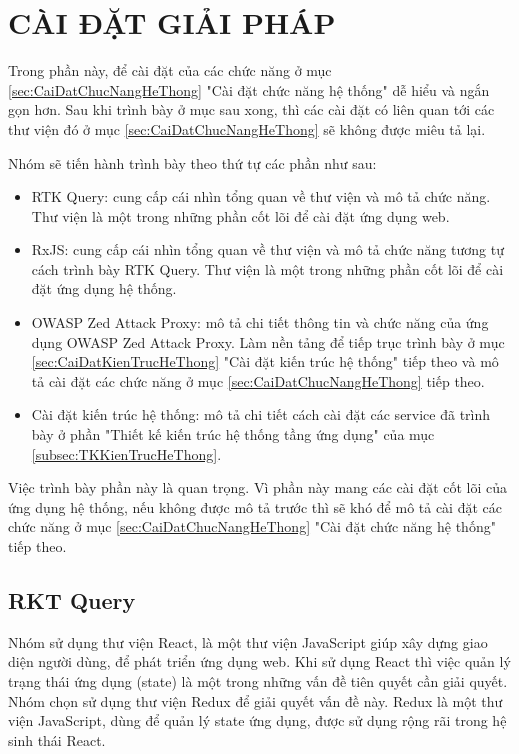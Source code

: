 \chapter{CÀI ĐẶT GIẢI PHÁP}

\tab Trong phần này, để cài đặt của các chức năng ở mục \ref{sec:CaiDatChucNangHeThong} "Cài đặt chức năng hệ thống" dễ hiểu và ngắn gọn hơn.
Sau khi trình bày ở mục sau xong, thì các cài đặt có liên quan tới các thư viện đó ở mục \ref{sec:CaiDatChucNangHeThong} sẽ không được miêu tả lại.

Nhóm sẽ tiến hành trình bày theo thứ tự các phần như sau:
\begin{itemize}
  \item RTK Query: cung cấp cái nhìn tổng quan về thư viện và mô tả chức năng.
  Thư viện là một trong những phần cốt lõi để cài đặt ứng dụng web.
  \item RxJS: cung cấp cái nhìn tổng quan về thư viện và mô tả chức năng tương tự cách trình bày RTK Query.
  Thư viện là một trong những phần cốt lõi để cài đặt ứng dụng hệ thống.
  \item OWASP Zed Attack Proxy: mô tả chi tiết thông tin và chức năng của ứng dụng OWASP Zed Attack Proxy.
  Làm nền tảng để tiếp trục trình bày ở mục \ref{sec:CaiDatKienTrucHeThong} "Cài đặt kiến trúc hệ thống" tiếp theo và mô tả cài đặt các chức năng ở mục \ref{sec:CaiDatChucNangHeThong} tiếp theo.
  \item Cài đặt kiến trúc hệ thống: mô tả chi tiết cách cài đặt các service đã trình bày ở phần "Thiết kế kiến trúc hệ thống tầng ứng dụng" của mục \ref{subsec:TKKienTrucHeThong}.
\end{itemize}

Việc trình bày phần này là quan trọng. Vì phần này mang các cài đặt cốt lõi của ứng dụng hệ thống, 
nếu không được mô tả trước thì sẽ khó để mô tả cài đặt các chức năng ở mục \ref{sec:CaiDatChucNangHeThong} "Cài đặt chức năng hệ thống" tiếp theo.

\section{RKT Query} \label{sec:RTKQ}

\tab Nhóm sử dụng thư viện React, là một thư viện JavaScript giúp xây dựng giao diện người dùng, để phát triển ứng dụng web.
Khi sử dụng React thì việc quản lý trạng thái ứng dụng (state) là một trong những vấn đề tiên quyết cần giải quyết.
Nhóm chọn sử dụng thư viện Redux để giải quyết vấn đề này.
Redux là một thư viện JavaScript, dùng để quản lý state ứng dụng, được sử dụng rộng rãi trong hệ sinh thái React.
\par

